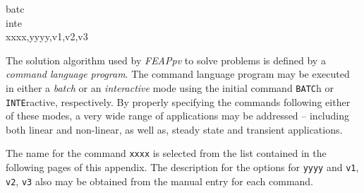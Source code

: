 {\hspace{1.2cm}batc \hfill} \\{\smallskip}
{\hspace{1.0cm}inte \hfill} \\{\smallskip}
{\hspace{1.0cm}xxxx,yyyy,v1,v2,v3 \hfill}
\headb


The solution algorithm used by {\sl FEAPpv} to solve problems
is defined by a {\it command language program}.  The command language
program may be executed in either a {\it batch} or an {\it interactive}
mode using the initial command {\tt BATC}h or {\tt INTE}ractive,
respectively.  By properly
specifying the commands following either of these modes,
a very wide range of applications
may be addressed -- including both linear and non-linear,
as well as, steady state and transient applications.

The name for the command {\tt xxxx} is selected from the list contained
in the following pages of this appendix. The description for the options for
{\tt yyyy} and {\tt v1}, {\tt v2}, {\tt v3}
also may be obtained from the manual entry for each command.
\vfill\eject
